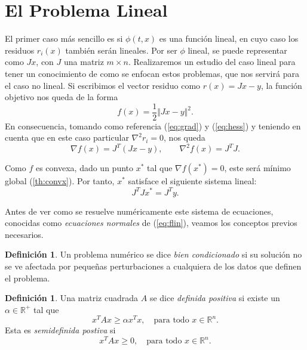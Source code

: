 \documentclass[11pt,a4paper]{book}
\theoremstyle{definition}
\newtheorem{definition}[theorem]{Definición}
\theoremstyle{remark}
\begin{document}
\section{El Problema Lineal}\label{sec:linealsqp}

El primer caso más sencillo es si $\phi (t, x)$ es una función lineal, en cuyo caso los residuos
$r_i(x)$ también serán lineales.
Por ser $\phi$ lineal, se puede representar como $Jx$, con $J$ una matriz
$m\times n$.
Realizaremos un estudio del caso lineal para tener un conocimiento de como se enfocan estos problemas,
que nos servirá para el caso no lineal.
Si escribimos el vector residuo como $r(x) = Jx-y$, la función objetivo nos queda de la forma
\begin{equation}
	f(x) = \frac{1}{2} \Vert Jx-y \Vert^2.
	\label{eq:flin}
\end{equation}
En consecuencia, tomando como referencia (\ref{eq:grad}) y (\ref{eq:hess}) y teniendo en cuenta que en este caso particular $\nabla^2r_i=0$, nos queda
\begin{equation}
	\nabla f(x) = J^T(Jx-y), \qquad \nabla^2 f(x) =  J^TJ.
\end{equation}

Como $f$ es convexa, dado un punto $x^*$ tal que $\nabla f(x^*) = 0$, este será mínimo global (\ref{th:convx}). Por tanto, $x^*$ satisface el siguiente sistema lineal:
\begin{equation}\label{eq:linsis}
	J^TJx^* = J^Ty.
\end{equation}

Antes de ver como se resuelve numéricamente este sistema de ecuaciones, conocidas como \textit{ecuaciones normales} de (\ref{eq:flin}), veamos los conceptos previos necesarios.

\begin{definition}
	Un problema numérico se dice \textit{bien condicionado} si su solución no se ve afectada por pequeñas perturbaciones a cualquiera de los datos que definen el problema.
\end{definition}

\begin{definition}
	Una matriz cuadrada $A$ se dice \textit{definida positiva} si existe un $\alpha \in \mathbb{R}^+$ tal que
	\begin{equation}
		x^TAx \geq \alpha x^T x, \quad \text{para todo } x \in \mathbb{R}^n.
	\end{equation}
	Esta es \textit{semidefinida postiva} si
	\begin{equation}
		x^TAx \geq 0, \quad \text{para todo } x \in \mathbb{R}^n.
	\end{equation}
\end{definition}
\end{document}
